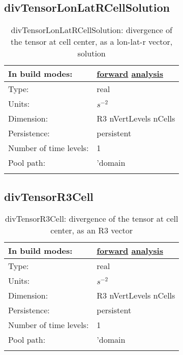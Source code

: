 \subsection[divTensorLonLatRCellSolution]{divTensorLonLatRCellSolution}
\label{subsec:var_sec_scratch_divTensorLonLatRCellSolution}
\begin{center}
\begin{longtable}{| p{2.0in} | p{4.0in} |}
        \hline 
        In build modes: & \hyperref[subsec:forward_var_tab_scratch]{forward} \hyperref[subsec:analysis_var_tab_scratch]{analysis} \\
        \hline 
        Type: & real \\
        \hline 
        Units: & $s^{-2}$ \\
        \hline 
        Dimension: & R3 nVertLevels nCells \\
        \hline 
        Persistence: & persistent \\
        \hline 
        Number of time levels: & 1 \\
        \hline 
            Pool path: & 'domain %
 \\
		 \hline 
    \caption{divTensorLonLatRCellSolution: divergence of the tensor at cell center, as a lon-lat-r vector, solution}
\end{longtable}
\end{center}
\subsection[divTensorR3Cell]{divTensorR3Cell}
\label{subsec:var_sec_scratch_divTensorR3Cell}
\begin{center}
\begin{longtable}{| p{2.0in} | p{4.0in} |}
        \hline 
        In build modes: & \hyperref[subsec:forward_var_tab_scratch]{forward} \hyperref[subsec:analysis_var_tab_scratch]{analysis} \\
        \hline 
        Type: & real \\
        \hline 
        Units: & $s^{-2}$ \\
        \hline 
        Dimension: & R3 nVertLevels nCells \\
        \hline 
        Persistence: & persistent \\
        \hline 
        Number of time levels: & 1 \\
        \hline 
            Pool path: & 'domain %
 \\
		 \hline 
    \caption{divTensorR3Cell: divergence of the tensor at cell center, as an R3 vector}
\end{longtable}
\end{center}
